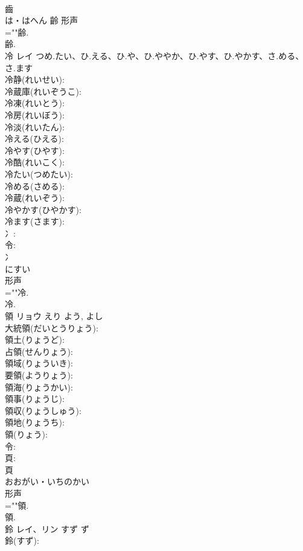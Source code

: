 \documentclass[8pt]{extreport}
\begin{document}
\begin{CJK}{UTF8}{min}
\\	齒	
\\	は・はへん	齡	形声 
\\	=""齢.
\\	齢.
\\	冷	レイ	つめ.たい、ひ.える、ひ.や、ひ.ややか、ひ.やす、ひ.やかす、さ.める、さ.ます		
\\	冷静(れいせい): 
\\	冷蔵庫(れいぞうこ): 
\\	冷凍(れいとう): 
\\	冷房(れいぼう): 
\\	冷淡(れいたん): 
\\	冷える(ひえる): 
\\	冷やす(ひやす): 
\\	冷酷(れいこく): 
\\	冷たい(つめたい): 
\\	冷める(さめる): 
\\	冷蔵(れいぞう): 
\\	冷やかす(ひやかす): 
\\	冷ます(さます): 
\\	冫: 
\\	令: 
\\	冫	
\\	にすい	
\\	形声 
\\	=""冷.
\\	冷.
\\	領	リョウ	えり	よう, よし	
\\	大統領(だいとうりょう): 
\\	領土(りょうど): 
\\	占領(せんりょう): 
\\	領域(りょういき): 
\\	要領(ようりょう): 
\\	領海(りょうかい): 
\\	領事(りょうじ): 
\\	領収(りょうしゅう): 
\\	領地(りょうち): 
\\	領(りょう): 
\\	令: 
\\	頁: 
\\	頁	
\\	おおがい・いちのかい	
\\	形声 
\\	=""領.
\\	領.
\\	鈴	レイ、リン	すず	ず	
\\	鈴(すず): 

\end{CJK}
\end{document}
